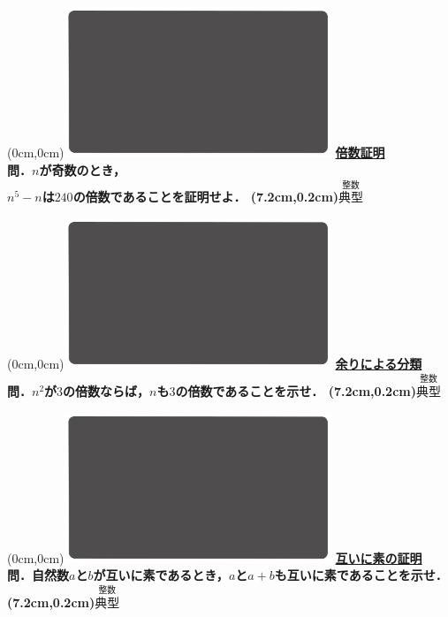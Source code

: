 \documentclass[10pt,
fleqn,
dvipdfmx,
uplatex
]{jsarticle}
\begin{document}
\at(0cm,0cm){\includegraphics[width=8cm,bb=0 0 1920 1080]{./media_local/smart_background/整数.jpeg}}
{\color{orange}\bf\boldmath\huge\underline{倍数証明}}\vspace{0.3zw}\\
\huge 
\bf\boldmath 問．$n$が奇数のとき，\\$n^5-n$は${240}$の倍数であることを証明せよ．
\at(7.2cm,0.2cm){\small\color{bradorange}$\overset{\text{整数}}{\text{典型}}$}


\newpage



\at(0cm,0cm){\includegraphics[width=8cm,bb=0 0 1920 1080]{./media_local/smart_background/整数.jpeg}}
{\color{orange}\bf\boldmath\LARGE\underline{余りによる分類}}\vspace{0.3zw}\\
\huge 
\bf\boldmath 問．$n^2$が$3$の倍数ならば，$n$も$3$の倍数であることを示せ．
\at(7.2cm,0.2cm){\small\color{bradorange}$\overset{\text{整数}}{\text{典型}}$}


\newpage



\at(0cm,0cm){\includegraphics[width=8cm,bb=0 0 1920 1080]{./media_local/smart_background/整数.jpeg}}
{\color{orange}\bf\boldmath\LARGE\underline{互いに素の証明}}\vspace{0.3zw}\\
\LARGE 
\bf\boldmath 問．自然数$a$と$b$が互いに素であるとき，$a$と$a+b$も互いに素であることを示せ．
\at(7.2cm,0.2cm){\small\color{bradorange}$\overset{\text{整数}}{\text{典型}}$}
\end{document}
